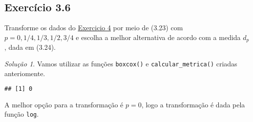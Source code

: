 \documentclass[
]{latex/krantz}
\newenvironment{Shaded}{\begin{snugshade}}{\end{snugshade}}
\newcommand{\ControlFlowTok}[1]{\textcolor[rgb]{0.13,0.29,0.53}{\textbf{#1}}}
\newcommand{\DecValTok}[1]{\textcolor[rgb]{0.00,0.00,0.81}{#1}}
\newcommand{\FunctionTok}[1]{\textcolor[rgb]{0.13,0.29,0.53}{\textbf{#1}}}
\newcommand{\NormalTok}[1]{#1}
\newcommand{\OtherTok}[1]{\textcolor[rgb]{0.56,0.35,0.01}{#1}}
\newcommand{\SpecialCharTok}[1]{\textcolor[rgb]{0.81,0.36,0.00}{\textbf{#1}}}
\newcommand{\StringTok}[1]{\textcolor[rgb]{0.31,0.60,0.02}{#1}}
\theoremstyle{definition}
\theoremstyle{definition}
\theoremstyle{definition}
\theoremstyle{definition}
\theoremstyle{remark}
\newtheorem*{solution}{Solução}
\begin{document}
\hypertarget{exr3-6}{%
\subsection*{Exercício 3.6}\label{exr3-6}}

Transforme os dados do \protect\hyperlink{exr3-4}{Exercicio 4} por meio de (3.23) com \(p = 0, 1/4, 1/3, 1/2, 3/4\) e escolha a melhor alternativa de acordo com a medida \(d_{p}\), dada em (3.24).

\begin{solution}
Vamos utilizar as funções \texttt{boxcox()} e \texttt{calcular\_metrica()} criadas anteriomente.

\begin{Shaded}
\end{Shaded}

\begin{verbatim}
## [1] 0
\end{verbatim}

A melhor opção para a transformação é \(p = 0\), logo a transformação é dada pela função \texttt{log}.


\end{solution}
\end{document}
